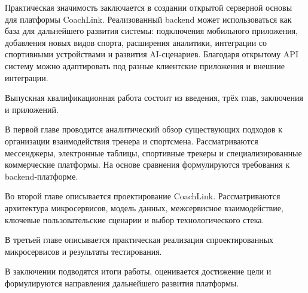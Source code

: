 Практическая значимость заключается в создании открытой серверной основы для платформы CoachLink. Реализованный backend может использоваться как база для дальнейшего развития системы: подключения мобильного приложения, добавления новых видов спорта, расширения аналитики, интеграции со спортивными устройствами и развития AI-сценариев. Благодаря открытому API систему можно адаптировать под разные клиентские приложения и внешние интеграции.

Выпускная квалификационная работа состоит из введения, трёх глав, заключения и приложений.

В первой главе проводится аналитический обзор существующих подходов к организации взаимодействия тренера и спортсмена. Рассматриваются мессенджеры, электронные таблицы, спортивные трекеры и специализированные коммерческие платформы. На основе сравнения формулируются требования к backend-платформе.

Во второй главе описывается проектирование CoachLink. Рассматриваются архитектура микросервисов, модель данных, межсервисное взаимодействие, ключевые пользовательские сценарии и выбор технологического стека.

В третьей главе описывается практическая реализация спроектированных микросервисов и результаты тестирования.

В заключении подводятся итоги работы, оценивается достижение цели и формулируются направления дальнейшего развития платформы.
